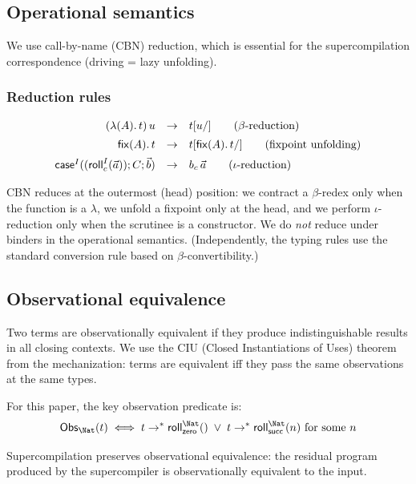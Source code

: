 \subsection{Operational semantics}

We use call-by-name (CBN) reduction, which is essential for the supercompilation correspondence (driving = lazy unfolding).

\subsubsection{Reduction rules}

\[
\begin{array}{rcl}
(\lambda(A).\,t)\,u &\to& t[u/] \qquad \text{($\beta$-reduction)} \\[0.5em]
\mathsf{fix}(A).\,t &\to& t[\mathsf{fix}(A).\,t/] \qquad \text{(fixpoint unfolding)} \\[0.5em]
\mathsf{case}^{I}((\mathsf{roll}^{I}_{c}(\vec{a}));C;\vec{b}) &\to& b_c\,\vec{a} \qquad \text{($\iota$-reduction)}
\end{array}
\]

\noindent CBN reduces at the outermost (head) position: we contract a $\beta$-redex only when the function is a $\lambda$, we unfold a fixpoint only at the head, and we perform $\iota$-reduction only when the scrutinee is a constructor.
We do \emph{not} reduce under binders in the operational semantics.
(Independently, the typing rules use the standard conversion rule based on $\beta$-convertibility.)

\subsection{Observational equivalence}

Two terms are observationally equivalent if they produce indistinguishable results in all closing contexts. We use the CIU (Closed Instantiations of Uses) theorem from the mechanization: terms are equivalent iff they pass the same observations at the same types.

For this paper, the key observation predicate is:
\[
\mathsf{Obs}_{\Nat}(t) \iff t \steps \Roll{\Nat}{\mathsf{zero}}{} \;\vee\; t \steps \Roll{\Nat}{\mathsf{succ}}{n} \text{ for some } n
\]

\noindent Supercompilation preserves observational equivalence: the residual program produced by the supercompiler is observationally equivalent to the input.
